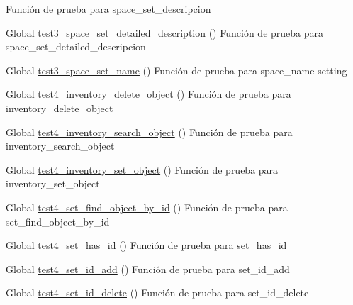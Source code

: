 \begin{DoxyRefList}
%
Función de prueba para space\+\_\+set\+\_\+descripcion  
\item[Global \mbox{\hyperlink{space__test_8c_a9bd3ad5b0c9b3e4a339fb1b0ff932ed2}{test3\+\_\+space\+\_\+set\+\_\+detailed\+\_\+description}} ()]\label{test__test000265}%
%
Función de prueba para space\+\_\+set\+\_\+detailed\+\_\+descripcion  
\item[Global \mbox{\hyperlink{space__test_8c_aa24a337830006e33706ab6ac1c416b47}{test3\+\_\+space\+\_\+set\+\_\+name}} ()]\label{test__test000224}%
%
Función de prueba para space\+\_\+name setting  
\item[Global \mbox{\hyperlink{inventory__test_8c_a260ed194aa039d7cf055944a3bc1c2e6}{test4\+\_\+inventory\+\_\+delete\+\_\+object}} ()]\label{test__test000059}%
%
Función de prueba para inventory\+\_\+delete\+\_\+object  
\item[Global \mbox{\hyperlink{inventory__test_8c_ae04f282fdf617aff63c4207ee1e41d1e}{test4\+\_\+inventory\+\_\+search\+\_\+object}} ()]\label{test__test000070}%
%
Función de prueba para inventory\+\_\+search\+\_\+object  
\item[Global \mbox{\hyperlink{inventory__test_8c_a64b2d92f50bb388e75bb03355aa8b5eb}{test4\+\_\+inventory\+\_\+set\+\_\+object}} ()]\label{test__test000047}%
%
Función de prueba para inventory\+\_\+set\+\_\+object  
\item[Global \mbox{\hyperlink{set__test_8c_aa8ba0e1129a84844e4621d3ca86008ce}{test4\+\_\+set\+\_\+find\+\_\+object\+\_\+by\+\_\+id}} ()]\label{test__test000207}%
%
Función de prueba para set\+\_\+find\+\_\+object\+\_\+by\+\_\+id  
\item[Global \mbox{\hyperlink{set__test_8c_a6a71db05b8235664b1e58668269f2a1f}{test4\+\_\+set\+\_\+has\+\_\+id}} ()]\label{test__test000203}%
%
Función de prueba para set\+\_\+has\+\_\+id  
\item[Global \mbox{\hyperlink{set__test_8c_a9bdb9407c9e526d4175d443b0129f42c}{test4\+\_\+set\+\_\+id\+\_\+add}} ()]\label{test__test000190}%
%
Función de prueba para set\+\_\+id\+\_\+add  
\item[Global \mbox{\hyperlink{set__test_8c_ac548868fd332f344efa73476cecaeed7}{test4\+\_\+set\+\_\+id\+\_\+delete}} ()]\label{test__test000194}%
%
Función de prueba para set\+\_\+id\+\_\+delete  

\end{DoxyRefList}
